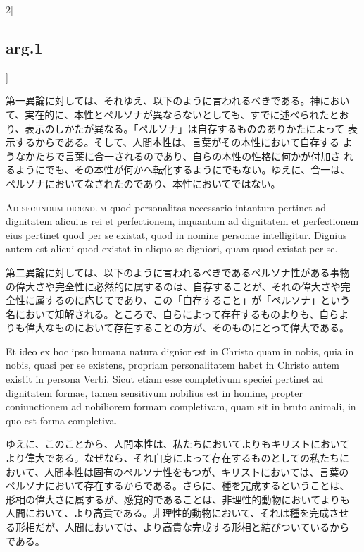 \documentclass[paper=a4paper,fontsize=10pt,jafontsize=9pt,titlepage]{jlreq}
\begin{document}
\begin{paracol}{2}[\subsection{arg.1}]
\switchcolumn

第一異論に対しては、それゆえ、以下のように言われるべきである。神におい
て、実在的に、本性とペルソナが異ならないとしても、すでに述べられたとお
り、表示のしかたが異なる。「ペルソナ」は自存するもののありかたによって
表示するからである。そして、人間本性は、言葉がその本性において自存する
ようなかたちで言葉に合一されるのであり、自らの本性の性格に何かが付加さ
れるようにでも、その本性が何かへ転化するようにでもない。ゆえに、合一は、
ペルソナにおいてなされたのであり、本性においてではない。

\switchcolumn*[\subsection{ad.2}]

{\scshape Ad secundum dicendum} quod personalitas necessario intantum
pertinet ad dignitatem alicuius rei et perfectionem, inquantum ad
dignitatem et perfectionem eius pertinet quod per se existat, quod in
nomine personae intelligitur. Dignius autem est alicui quod existat in
aliquo se digniori, quam quod existat per se.

\switchcolumn

第二異論に対しては、以下のように言われるべきであるペルソナ性がある事物
の偉大さや完全性に必然的に属するのは、自存することが、それの偉大さや完
全性に属するのに応じてであり、この「自存すること」が「ペルソナ」という
名において知解される。ところで、自らによって存在するものよりも、自らよ
りも偉大なものにおいて存在することの方が、そのものにとって偉大である。

\switchcolumn*

Et ideo ex hoc ipso humana natura dignior est in Christo quam in
nobis, quia in nobis, quasi per se existens, propriam personalitatem
habet in Christo autem existit in persona Verbi. Sicut etiam esse
completivum speciei pertinet ad dignitatem formae, tamen sensitivum
nobilius est in homine, propter coniunctionem ad nobiliorem formam
completivam, quam sit in bruto animali, in quo est forma completiva.

\switchcolumn

ゆえに、このことから、人間本性は、私たちにおいてよりもキリストにおいて
より偉大である。なぜなら、それ自身によって存在するものとしての私たちに
おいて、人間本性は固有のペルソナ性をもつが、キリストにおいては、言葉の
ペルソナにおいて存在するからである。さらに、種を完成するということは、
形相の偉大さに属するが、感覚的であることは、非理性的動物においてよりも
人間において、より高貴である。非理性的動物において、それは種を完成させ
る形相だが、人間においては、より高貴な完成する形相と結びついているから
である。


\end{paracol}
\end{document}

